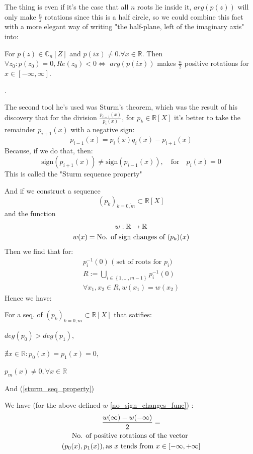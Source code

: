 The thing is even if it's the case that all $n$ roots lie inside it,
$arg(p(z))$ will only make $\frac{n}{2}$ rotations since this is a
half circle, so we could combine this fact with a more elegant way of
writing "the half-plane, left of the imaginary axis" into:

\begin{lemma}\label{cauchy_arg_lemma}
For $p(z) \in \mathbb{C}_n[Z]$ and $p(ix) \neq 0. \forall x \in
\mathbb{R}$. Then $\forall z_0 : p(z_0) = 0, Re(z_0) < 0 \iff$
$arg(p(ix))$ makes $\frac{n}{2}$ positive rotations for $x \in
[-\infty , \infty]$.
\end{lemma}

.

The second tool he's used was Sturm's theorem, which was the result
of his discovery that for the division $\frac{p_{i-1}(x)}{p_i(x)}$,
for $p_k \in \mathbb{R}[X]$ it's better to take the remainder
$p_{i+1}(x)$ with a negative sign:
\begin{equation}\label{euclid_algorithm}
p_{i-1}(x) = p_i(x) q_i(x) - p_{i+1}(x) \tag{Euclid's Algorithm}
\end{equation}
Because, if we do that, then:
\begin{equation}\label{sturm_seq_property}
\text{sign} ( p_{i+1}(x) )  \neq \text{sign} ( p_{i-1}(x) ), \quad
\text{for} \quad p_i(x)=0 \tag{Sturm. Seq. Property}
\end{equation}
This is called the "Sturm sequence property"

And if we construct a sequence
\[
(p_k)_{k = \overline{0,m}} \subset \mathbb{R}[X]
\]
and the function
\begin{gather}\label{no_sign_changes_func}
w : \mathbb{R} \rightarrow \mathbb{R} \notag  \\
w(x) = \text{No. of sign changes of  } (p_k)(x) \notag
\end{gather}
Then we find that for:
\begin{gather*}
p_i^{-1}(0) \text{ ( set of roots for $p_i$) } \\
R := \bigcup_{i \in \left\{ 1, \dots, m-1 \right\} } p_i^{-1}(0) \\
\forall x_1, x_2 \in R, w(x_1) = w(x_2)
\end{gather*}
Hence we have:
\begin{lemma}\label{sturm_lemma}
For a seq. of $  (p_k)_{k = \overline{0,m}} \subset \mathbb{R}[X]$
that satifies:

$ deg(p_0) > deg(p_1), $

$\nexists x \in \mathbb{R} : p_0(x) = p_1(x) = 0, $

$p_m(x) \neq 0, \forall x \in \mathbb{R}$

And (\ref{sturm_seq_property})
\par
We have (for the above defined $w$ \ref{no_sign_changes_func}) :
\begin{gather}
	\frac{w(\infty) - w(-\infty)}{2} =  \notag \\
	\text{No. of positive rotations of the vector } \notag \\
	(p_0(x), p_1(x)), \text{as $x$ tends from  } x \in [-\infty, +\infty] \notag
\end{gather}
\end{lemma}

